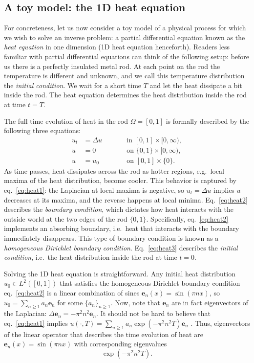 \documentclass[ba]{imsart}
\newcommand{\ev}{\mathbf{e}} \newcommand{\func}{\mathbf{a}}
\theoremstyle{plain}
\theoremstyle{definition}
\theoremstyle{remark}
\begin{document}
\subsection{A toy model: the 1D heat equation}\label{subsec:toy}
For concreteness, let us now consider a toy model of a physical
process for which we wish to solve an inverse problem: a partial
differential equation known as the \emph{heat equation} in one
dimension (1D heat equation henceforth). Readers less familiar with
partial differential equations can think of the following setup:
before us there is a perfectly insulated metal rod. At each point on
the rod the temperature is different and unknown, and we call this
temperature distribution the \emph{initial condition}. We wait for a
short time $T$ and let the heat dissipate a bit inside the rod. The
heat equation determines the heat distribution inside the rod at time
$t=T$.

The full time evolution of heat in the rod $\Omega=[0,1]$ is formally
described by the following three equations:
\begin{subequations}
  \begin{alignat}{2}
    u_t &= \Delta u &&\qquad \text{in } [0,1] \times [0,\infty), \label{eq:heat1}\\
    u &= 0 &&\qquad \text{on } \{0, 1\} \times [0,\infty), \label{eq:heat2}\\
    u &= u_0 &&\qquad \text{on }[0,1] \times \{0\}. \label{eq:heat3}
  \end{alignat}
\end{subequations}
As time passes, heat dissipates across the rod as hotter regions,
e.g.~local maxima of the heat distribution, become cooler. This
behavior is captured by eq.~\eqref{eq:heat1}: the Laplacian at local
maxima is negative, so $u_t = \Delta u$ implies $u$ decreases at its
maxima, and the reverse happens at local minima. Eq.~\eqref{eq:heat2}
describes the \emph{boundary condition}, which dictates how heat
interacts with the outside world at the two edges of the rod
$\{0,1\}$. Specifically, eq.~\eqref{eq:heat2} implements an absorbing
boundary, i.e.~heat that interacts with the boundary immediately
disappears. This type of boundary condition is known as a
\emph{homogeneous Dirichlet boundary condition}. Eq.~\eqref{eq:heat3}
describes the \emph{initial condition}, i.e.~the heat distribution
inside the rod at time $t=0$.

Solving the 1D heat equation is straightforward. Any initial heat
distribution $u_0\in L^2([0,1])$ that satisfies the homogeneous
Dirichlet boundary condition eq.~\eqref{eq:heat2} is a linear
combination of sines $\ev_n(x) = \sin(\pi n x)$, so $u_0 = \sum_{n\geq
  1} a_n \ev_n$ for some $\{a_n\}_{n\geq 1}$. Now, note that $\ev_n$
are in fact eigenvectors of the Laplacian: $\Delta \ev_n = -\pi^2
n^2\ev_n$. It should not be hard to believe that eq.~\eqref{eq:heat1}
implies $u(\cdot, T) = \sum_{n\geq 1} a_n \exp(-\pi^2 n^2T ) \ev_n$
\cite{renardy2006PDE}. Thus, eigenvectors of the linear operator that
describes the time evolution of heat are $\ev_n(x) = \sin(\pi n x)$
with corresponding eigenvalues
\begin{equation}\label{eq:decay}
  \exp(-\pi^2 n^2T ).
\end{equation}
\end{document}
